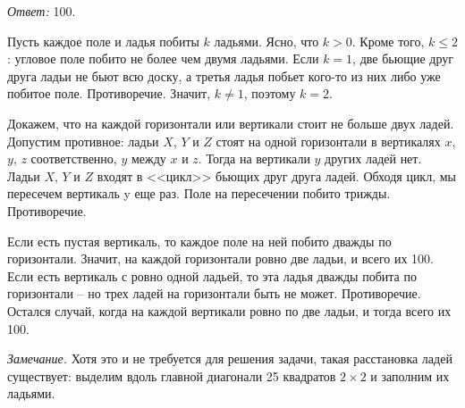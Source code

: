 \ifincludesolutions
\emph{Ответ:} 100.
\par
Пусть каждое поле и ладья побиты $k$ ладьями.
Ясно, что $k > 0$.
Кроме того, $k \leq 2$: угловое поле побито не более чем двумя ладьями.
Если $k = 1$, две бьющие друг друга ладьи не бьют всю доску, а третья ладья
побьет кого-то из них либо уже побитое поле.
Противоречие.
Значит, $k \neq 1$, поэтому $k = 2$.
\par
Докажем, что на каждой горизонтали или вертикали стоит не больше двух ладей.
Допустим противное: ладьи $X$, $Y$ и $Z$ стоят на одной горизонтали
в вертикалях $x$, $y$, $z$ соответственно, $y$ между $x$ и $z$.
Тогда на вертикали $y$ других ладей нет.
Ладьи $X$, $Y$ и $Z$ входят в <<цикл>> бьющих друг друга ладей.
Обходя цикл, мы пересечем вертикаль y еще раз.
Поле на пересечении побито трижды.
Противоречие.
\par
Если есть пустая вертикаль, то каждое поле на ней побито дважды по горизонтали.
Значит, на каждой горизонтали ровно две ладьи, и всего их 100.
Если есть вертикаль с ровно одной ладьей, то эта ладья дважды побита по горизонтали – но трех ладей на горизонтали быть не может. Противоречие.
Остался случай, когда на каждой вертикали ровно по две ладьи, и тогда всего
их 100.
\par
\emph{Замечание.}
Хотя это и не требуется для решения задачи, такая расстановка ладей существует:
выделим вдоль главной диагонали 25 квадратов $2 \times 2$ и заполним
их ладьями.
\fi %

